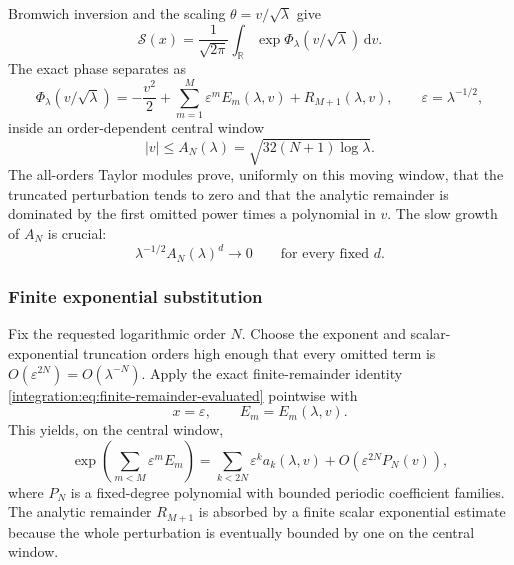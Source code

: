 \documentclass[11pt,oneside]{article}
\theoremstyle{definition}
\theoremstyle{remark}
\newcommand{\R}{\mathbb R}
\newcommand{\dd}{\,\mathrm d}
\begin{document}
Bromwich inversion and the scaling $\theta=v/\sqrt\lambda$ give
\begin{equation}
 \mathcal S(x)=\frac1{\sqrt{2\pi}}
 \int_{\R}\exp\Phi_\lambda(v/\sqrt\lambda)\dd v.
 \label{integration:eq:normalized-saddle-integral}
\end{equation}
The exact phase separates as
\begin{equation}
 \Phi_\lambda(v/\sqrt\lambda)
 =-\frac{v^2}{2}+
 \sum_{m=1}^{M}\varepsilon^mE_m(\lambda,v)
 +R_{M+1}(\lambda,v),
 \qquad
 \varepsilon=\lambda^{-1/2},
 \label{integration:eq:central-exponent-expansion}
\end{equation}
inside an order-dependent central window
\begin{equation}
 |v|\le A_N(\lambda)=\sqrt{32(N+1)\log\lambda}.
 \label{integration:eq:central-window-lambda}
\end{equation}
The all-orders Taylor modules prove, uniformly on this moving window, that the truncated
perturbation tends to zero and that the analytic remainder is dominated by the first omitted
power times a polynomial in $v$.  The slow growth of $A_N$ is crucial:
\begin{equation}
 \lambda^{-1/2}A_N(\lambda)^d\longrightarrow0
 \qquad\text{for every fixed }d.
 \label{integration:eq:epsilon-log-radius-decay}
\end{equation}

\subsubsection{Finite exponential substitution}

Fix the requested logarithmic order $N$.  Choose the exponent and scalar-exponential
truncation orders high enough that every omitted term is
$O(\varepsilon^{2N})=O(\lambda^{-N})$.  Apply the exact finite-remainder identity
\eqref{integration:eq:finite-remainder-evaluated} pointwise with
\begin{equation}
 x=\varepsilon,
 \qquad
 E_m=E_m(\lambda,v).
 \label{integration:eq:finite-exp-saddle-substitution}
\end{equation}
This yields, on the central window,
\begin{equation}
 \exp\!\left(\sum_{m<M}\varepsilon^mE_m\right)
 =\sum_{k<2N}\varepsilon^ka_k(\lambda,v)
 +O\!\left(\varepsilon^{2N}P_N(v)\right),
 \label{integration:eq:central-reference-expansion}
\end{equation}
where $P_N$ is a fixed-degree polynomial with bounded periodic coefficient families.  The
analytic remainder $R_{M+1}$ is absorbed by a finite scalar exponential estimate because the
whole perturbation is eventually bounded by one on the central window.
\end{document}
